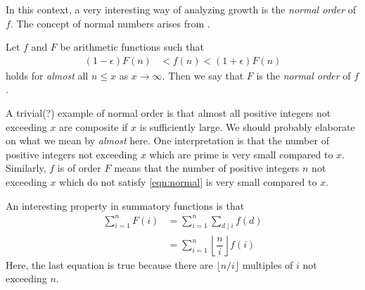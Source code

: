 \documentclass[elemannt.tex]{subfile}
\begin{document}
	In this context, a very interesting way of analyzing growth is the \textit{normal order} of $f$. The concept of normal numbers arises from \textcite{hardy_aiyangar_1917}.
		\begin{definition}
			Let $f$ and $F$ be arithmetic functions such that
				\begin{align}
					(1-\epsilon)F(n)
						& < f(n)<(1+\epsilon)F(n)\label{eqn:normal}
				\end{align}
			holds for \textit{almost} all $n\leq x$ as $x\to\infty$. Then we say that $F$ is the \textit{normal order} of $f$.
		\end{definition}
	A trivial(?) example of normal order is that almost all positive integers not exceeding $x$ are composite if $x$ is sufficiently large. We should probably elaborate on what we mean by \textit{almost} here. One interpretation is that the number of positive integers not exceeding $x$ which are prime is very small compared to $x$. Similarly, $f$ is of order $F$ means that the number of positive integers $n$ not exceeding $x$ which do not satisfy \ref{eqn:normal} is very small compared to $x$.

	An interesting property in summatory functions is that
		\begin{align*}
			\sum_{i=1}^{n}F(i)
				& = \sum_{i=1}^{n}\sum_{d\mid i}f(d)\\
				& = \sum_{i=1}^{n}\left\lfloor{\dfrac{n}{i}}\right\rfloor f(i)
		\end{align*}
	Here, the last equation is true because there are $\lfloor{n/i}\rfloor$ multiples of $i$ not exceeding $n$.
\end{document}

